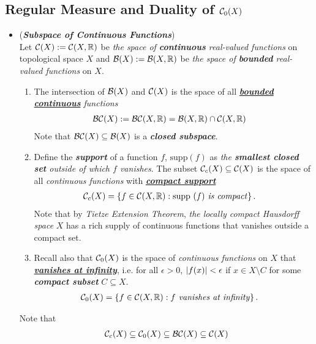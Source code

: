 \documentclass[11pt]{article}
\begin{document}
\subsection{Regular Measure and Duality of ${\mathcal C}_0(X)$}
\begin{itemize}
\item \begin{definition} (\emph{\textbf{Subspace of Continuous Functions}})\\
Let ${\mathcal C}(X) := {\mathcal C}(X, {\mathbb R})$ be \emph{the space of \textbf{continuous} real-valued functions} on topological space $X$ and ${\mathcal B}(X): = {\mathcal B}(X, {\mathbb R})$ be \emph{the space of \textbf{bounded} real-valued functions} on $X$.
\begin{enumerate}
\item The intersection of  ${\mathcal B}(X)$ and ${\mathcal C}(X)$ is the space of all \emph{\underline{\textbf{bounded continuous}} functions}
\begin{align*}
{\mathcal B}{\mathcal C}(X) := \mathcal{BC}(X, {\mathbb R}) &= {\mathcal B}(X, {\mathbb R}) \cap {\mathcal C}(X, {\mathbb R})
\end{align*} Note that $\mathcal{BC}(X) \subseteq {\mathcal B}(X)$ is a \emph{\textbf{closed subspace}}. 

\item Define the \emph{\textbf{support}} of a function $f$, $\text{supp}(f)$ as  \emph{the \textbf{smallest closed set} outside of which  $f$ vanishes}. The subset ${\mathcal C}_{c}(X) \subseteq {\mathcal C}(X)$ is the space of all \emph{continuous functions} with \underline{\emph{\textbf{compact support}}}
\begin{align*}
{\mathcal C}_{c}(X) &= \left\{f \in {\mathcal C}(X, {\mathbb R}): \text{supp }(f) \text{\emph{ is compact}}\right\}.
\end{align*} Note that by \emph{Tietze Extension Theorem}, \emph{the locally compact Hausdorff space} $X$ has a rich supply of continuous functions that vanishes outside a compact set.

\item Recall also that ${\mathcal C}_{0}(X)$ is the space of \emph{continuous functions} on $X$ that \underline{\emph{\textbf{vanishes at infinity}}}, i.e. for all $\epsilon >0$, $\left\lvert f(x) \right\rvert < \epsilon$ if $x \in X\setminus C$ for some \emph{\textbf{compact subset}} $C \subseteq X$.
\begin{align*}
{\mathcal C}_{0}(X) &= \left\{f \in {\mathcal C}(X, {\mathbb R}): f \text{\emph{ vanishes at infinity}}\right\}.
\end{align*} 
\end{enumerate}
Note that 
\begin{align*}
{\mathcal C}_{c}(X)  \subseteq {\mathcal C}_{0}(X) \subseteq \mathcal{BC}(X) \subseteq {\mathcal C}(X)
\end{align*}
\end{definition}


\end{itemize}
\end{document}
